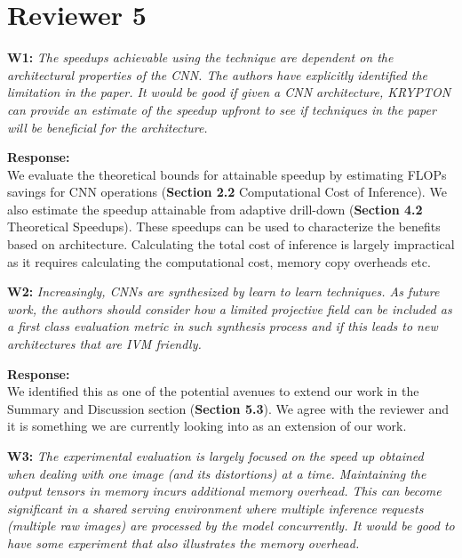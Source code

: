 \documentclass[preprint]{vldb}
\begin{document}
\section{Reviewer 5}

\vspace{2mm}
\noindent \textbf{W1:} \textit{ The speedups achievable using the technique are dependent on the architectural properties of the CNN. The authors have explicitly identified the limitation in the paper. It would be good if given a CNN architecture, KRYPTON can provide an estimate of the speedup upfront to see if techniques in the paper will be beneficial for the architecture.}

\vspace{2mm}
\noindent \textbf{Response:}\\
We evaluate the theoretical bounds for attainable speedup by estimating FLOPs savings for CNN operations (\textbf{Section 2.2} Computational Cost of Inference).
We also estimate the speedup attainable from adaptive drill-down (\textbf{Section 4.2} Theoretical Speedups).
These speedups can be used to characterize the benefits based on architecture.
Calculating the total cost of inference is largely impractical as it requires calculating the computational cost, memory copy overheads etc.


\vspace{2mm}
\noindent \textbf{W2:} \textit{ Increasingly, CNNs are synthesized by learn to learn techniques. As future work, the authors should consider how a limited projective field can be included as a first class evaluation metric in such synthesis process and if this leads to new architectures that are IVM friendly.}

\vspace{2mm}
\noindent \textbf{Response:}\\
We identified this as one of the potential avenues to extend our work in the Summary and Discussion section (\textbf{Section 5.3}).
We agree with the reviewer and it is something we are currently looking into as an extension of our work.

\vspace{2mm}
\noindent \textbf{W3:} \textit{ The experimental evaluation is largely focused on the speed up obtained when dealing with one image (and its distortions) at a time. Maintaining the output tensors in memory incurs additional memory overhead. This can become significant in a shared serving environment where multiple inference requests (multiple raw images) are processed by the model concurrently. It would be good to have some experiment that also illustrates the memory overhead.}
\end{document}
